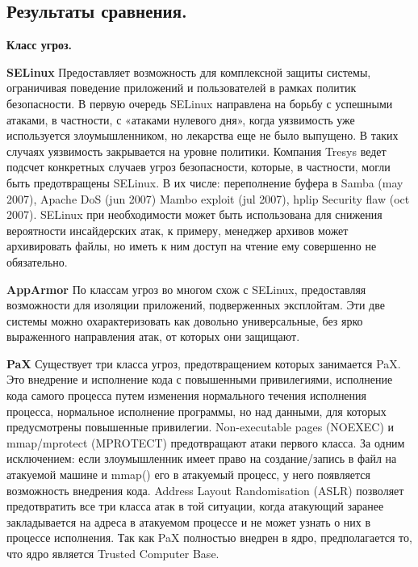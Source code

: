 \bigskip
\subsection{Результаты сравнения.} 

{\bfseries Класс угроз.}

\bigskip

{\bfseries SELinux} 
Предоставляет возможность для комплексной 
защиты системы, ограничивая поведение 
приложений и пользователей в рамках политик 
безопасности. В первую очередь SELinux 
направлена на борьбу с успешными атаками, 
в частности, с «атаками нулевого дня», когда 
уязвимость уже используется злоумышленником, 
но лекарства еще не было выпущено. В таких 
случаях уязвимость закрывается на уровне 
политики. Компания Tresys ведет подсчет 
конкретных случаев угроз безопасности, которые, 
в частности, могли быть предотвращены SELinux. 
В их числе: переполнение буфера в Samba (may 
2007), Apache DoS (jun 2007) Mambo exploit (jul 
2007), hplip Security flaw (oct 2007). SELinux 
при необходимости может быть использована для 
снижения вероятности инсайдерских атак, к примеру, 
менеджер архивов может архивировать файлы, но иметь 
к ним доступ на чтение ему совершенно не обязательно. 

\bigskip
{\bfseries AppArmor}
По классам угроз во многом схож с SELinux, 
предоставляя возможности для изоляции приложений, 
подверженных эксплойтам. Эти две системы можно 
охарактеризовать как довольно универсальные, 
без ярко выраженного направления атак, от которых 
они защищают.

\bigskip
{\bfseries PaX } 
Существует три класса угроз, предотвращением которых 
занимается PaX. Это внедрение и исполнение кода с 
повышенными привилегиями, исполнение кода самого 
процесса путем изменения нормального течения 
исполнения процесса, нормальное исполнение программы, 
но над данными, для которых предусмотрены повышенные 
привилегии. Non-executable pages (NOEXEC) и mmap/mprotect 
(MPROTECT) предотвращают атаки первого класса. За одним 
исключением: если злоумышленник имеет право на 
создание/запись в файл на атакуемой машине и mmap() 
его в атакуемый процесс, у него появляется возможность 
внедрения кода. Address Layout Randomisation (ASLR) 
позволяет предотвратить все три класса атак в той 
ситуации, когда атакующий заранее закладывается на 
адреса в атакуемом процессе и не может узнать о них 
в процессе исполнения. Так как PaX полностью внедрен 
в ядро, предполагается то, что ядро является Trusted 
Computer Base. 

